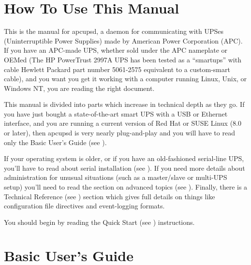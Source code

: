 \normalsize

\label{How-To-Use-This-Manual}

\section*{How To Use This Manual}

\label{index-Using-this-Manual-3}
This is the manual for apcupsd, a daemon for communicating with UPSes
(Uninterruptible Power Supplies) made by American Power Corporation (APC).  If
you have an APC-made UPS, whether sold under the APC nameplate or OEMed (The
HP PowerTrust 2997A UPS has been tested as a ``smartups'' with cable Hewlett
Packard part number 5061-2575 equivalent to a custom-smart cable), and you
want you get it working with a computer running Linux, Unix, or Windows NT,
you are reading the right document.  

This manual is divided into parts which increase in technical depth as they
go.  If you have just bought a state-of-the-art smart UPS with a USB or
Ethernet interface, and you are running a current version of Red Hat or SUSE
Linux (8.0 or later), then apcupsd is very nearly plug-and-play and you will
have to read only the Basic User's Guide (see 
).  

If your operating system is older, or if you have an old-fashioned serial-line
UPS, you'll have to read about serial installation (see 
).  If you need more
details about administration for unusual situations (such as a master/slave or
multi-UPS setup) you'll need to read the section on advanced topics (see 
). Finally, there is a
Technical Reference (see 
) section which
gives full details on things like configuration file directives and
event-logging formats.  

You should begin by reading the Quick Start (see 
)
instructions. 

\label{Basic-User_0027s-Guide}

\section*{Basic User's Guide}

